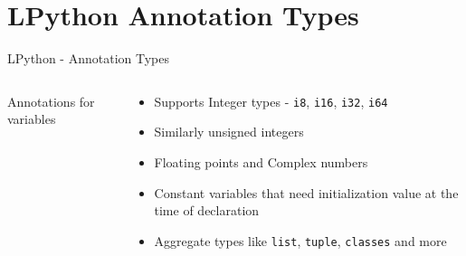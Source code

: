 \section{LPython Annotation Types}

\begin{frame}{LPython - Annotation Types}
    \begin{columns}
        \begin{column}{0.5\textwidth}
            \tiny
            
            \centering Annotations for variables
        \end{column}
        \begin{column}{0.5\textwidth}
            \begin{itemize}
                \item Supports Integer types - \texttt{i8}, \texttt{i16}, \texttt{i32}, \texttt{i64}
                \item Similarly unsigned integers
                \item Floating points and Complex numbers
                \item Constant variables that need initialization value at the time of declaration
                \item Aggregate types like \texttt{list}, \texttt{tuple}, \texttt{classes} and more
            \end{itemize}
        \end{column}
    \end{columns}
\end{frame}

